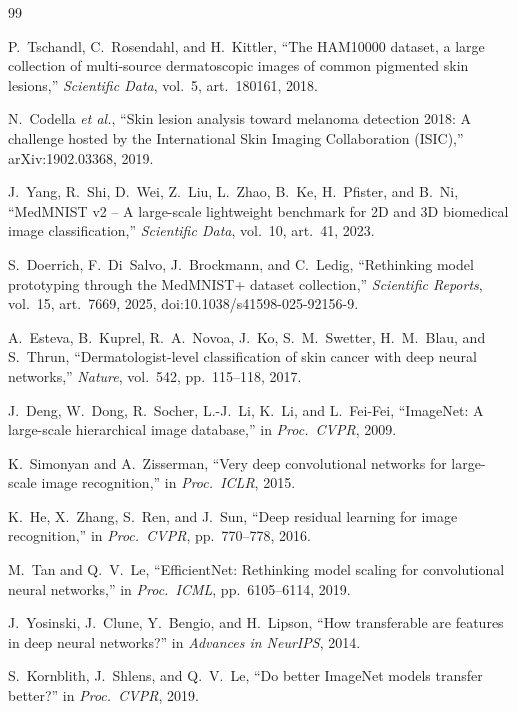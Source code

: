 \begin{thebibliography}{99}
\small

 P.~Tschandl, C.~Rosendahl, and H.~Kittler, ``The HAM10000 dataset, a large collection of
multi-source dermatoscopic images of common pigmented skin lesions,'' \emph{Scientific Data}, vol.~5, art.~180161,
2018.

 N.~Codella \emph{et al.}, ``Skin lesion analysis toward melanoma detection 2018: A challenge
hosted by the International Skin Imaging Collaboration (ISIC),'' arXiv:1902.03368, 2019.

 J.~Yang, R.~Shi, D.~Wei, Z.~Liu, L.~Zhao, B.~Ke, H.~Pfister, and B.~Ni, ``MedMNIST v2 -- A
large-scale lightweight benchmark for 2D and 3D biomedical image classification,'' \emph{Scientific Data},
vol.~10, art.~41, 2023.

 S.~Doerrich, F.~Di~Salvo, J.~Brockmann, and C.~Ledig, ``Rethinking model prototyping
through the MedMNIST+ dataset collection,'' \emph{Scientific Reports}, vol.~15, art.~7669, 2025,
doi:10.1038/s41598-025-92156-9.

 A.~Esteva, B.~Kuprel, R.~A.~Novoa, J.~Ko, S.~M.~Swetter, H.~M.~Blau, and S.~Thrun,
``Dermatologist-level classification of skin cancer with deep neural networks,'' \emph{Nature}, vol.~542,
pp.~115--118, 2017.

 J.~Deng, W.~Dong, R.~Socher, L.-J.~Li, K.~Li, and L.~Fei-Fei, ``ImageNet: A large-scale
hierarchical image database,'' in \emph{Proc.\ CVPR}, 2009.

 K.~Simonyan and A.~Zisserman, ``Very deep convolutional networks for large-scale image
recognition,'' in \emph{Proc.\ ICLR}, 2015.

 K.~He, X.~Zhang, S.~Ren, and J.~Sun, ``Deep residual learning for image recognition,'' in
\emph{Proc.\ CVPR}, pp.~770--778, 2016.

 M.~Tan and Q.~V.~Le, ``EfficientNet: Rethinking model scaling for convolutional neural
networks,'' in \emph{Proc.\ ICML}, pp.~6105--6114, 2019.

 J.~Yosinski, J.~Clune, Y.~Bengio, and H.~Lipson, ``How transferable are features in deep
neural networks?'' in \emph{Advances in NeurIPS}, 2014.

 S.~Kornblith, J.~Shlens, and Q.~V.~Le, ``Do better ImageNet models transfer better?''
in \emph{Proc.\ CVPR}, 2019.


\end{thebibliography}
